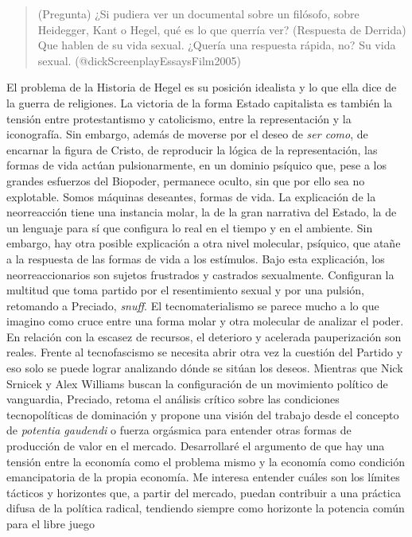 \documentclass[
]{article}
\begin{document}
\begin{quote}
(Pregunta) ¿Si pudiera ver un documental sobre un filósofo, sobre
Heidegger, Kant o Hegel, qué es lo que querría ver? (Respuesta de
Derrida) Que hablen de su vida sexual. ¿Quería una respuesta rápida, no?
Su vida sexual. (@dickScreenplayEssaysFilm2005)
\end{quote}

El problema de la Historia de Hegel es su posición idealista y lo que
ella dice de la guerra de religiones. La victoria de la forma Estado
capitalista es también la tensión entre protestantismo y catolicismo,
entre la representación y la iconografía. Sin embargo, además de moverse
por el deseo de \emph{ser como}, de encarnar la figura de Cristo, de
reproducir la lógica de la representación, las formas de vida actúan
pulsionarmente, en un dominio psíquico que, pese a los grandes esfuerzos
del Biopoder, permanece oculto, sin que por ello sea no explotable.
Somos máquinas deseantes, formas de vida. La explicación de la
neorreacción tiene una instancia molar, la de la gran narrativa del
Estado, la de un lenguaje para sí que configura lo real en el tiempo y
en el ambiente. Sin embargo, hay otra posible explicación a otra nivel
molecular, psíquico, que atañe a la respuesta de las formas de vida a
los estímulos. Bajo esta explicación, los neorreaccionarios son sujetos
frustrados y castrados sexualmente. Configuran la multitud que toma
partido por el resentimiento sexual y por una pulsión, retomando a
Preciado, \emph{snuff}. El tecnomaterialismo se parece mucho a lo que
imagino como cruce entre una forma molar y otra molecular de analizar el
poder. En relación con la escasez de recursos, el deterioro y acelerada
pauperización son reales. Frente al tecnofascismo se necesita abrir otra
vez la cuestión del Partido y eso solo se puede lograr analizando dónde
se sitúan los deseos. Mientras que Nick Srnicek y Alex Williams buscan
la configuración de un movimiento político de vanguardia, Preciado,
retoma el análisis crítico sobre las condiciones tecnopolíticas de
dominación y propone una visión del trabajo desde el concepto de
\emph{potentia gaudendi} o fuerza orgásmica para entender otras formas
de producción de valor en el mercado. Desarrollaré el argumento de que
hay una tensión entre la economía como el problema mismo y la economía
como condición emancipatoria de la propia economía. Me interesa entender
cuáles son los límites tácticos y horizontes que, a partir del mercado,
puedan contribuir a una práctica difusa de la política radical,
tendiendo siempre como horizonte la potencia común para el libre juego
\end{document}
